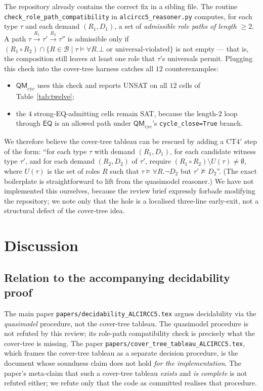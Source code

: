 \documentclass[]{ceurart}
\newcommand{\EQ}{\mathsf{EQ}}
\newcommand{\comp}{\circ}
\theoremstyle{definition}
\theoremstyle{remark}
\begin{document}
The repository already contains the correct fix in a sibling file.
The routine
\verb|check_role_path_compatibility| in \verb|alcircc5_reasoner.py|
computes, for each type $\tau$ and each demand $(R_1, D_1)$, a set of
\emph{admissible role paths of length $\geq 2$}. A path
$\tau \!\xrightarrow{R_1}\! \tau' \!\xrightarrow{R_2}\! \tau''$ is
admissible only if
$(R_1 \comp R_2) \cap \{R \in \mathcal{B} \mid \tau \models \forall
R . \bot \text{ or universal-violated} \}$ is not empty --- that
is, the composition still leaves at least one role that $\tau$'s
universals permit.  Plugging this check into the cover-tree harness
catches all $12$ counterexamples:
\begin{itemize}
  \item $\mathsf{QM}_{\mathrm{cyc}}$ uses this check and reports
    UNSAT on all $12$ cells of Table~\ref{tab:twelve};
  \item the $4$ strong-EQ-admitting cells remain SAT, because the
    length-$2$ loop through $\EQ$ is an allowed path under
    $\mathsf{QM}_{\mathrm{cyc}}$'s \verb|cycle_close=True| branch.
\end{itemize}

We therefore believe the cover-tree tableau can be rescued by adding
a CT4$'$ step of the form: ``for each type $\tau$ with demand
$(R_1, D_1)$, for each candidate witness type $\tau'$, and for each
demand $(R_2, D_2)$ of $\tau'$, require
$(R_1 \comp R_2) \setminus U(\tau) \neq \emptyset$, where $U(\tau)$ is
the set of roles $R$ such that $\tau \models \forall R . \neg D_2$ but
$\tau' \not\models D_2$''.  (The exact boilerplate is straightforward
to lift from the quasimodel reasoner.)  We have not implemented this
ourselves, because the review brief expressly forbade modifying the
repository; we note only that the hole is a localised three-line
early-exit, not a structural defect of the cover-tree idea.

\section{Discussion}
\label{sec:discussion}

\subsection{Relation to the accompanying decidability proof}

The main paper \verb|papers/decidability_ALCIRCC5.tex| argues
decidability via the \emph{quasimodel} procedure, not the cover-tree
tableau. The quasimodel procedure is not refuted by this review; its
role-path compatibility check is precisely what the cover-tree is
missing.  The paper
\verb|papers/cover_tree_tableau_ALCIRCC5.tex|, which frames the
cover-tree tableau as a separate decision procedure, is
the document whose soundness claim does not hold \emph{for the
implementation}. The paper's meta-claim that such a cover-tree
tableau \emph{exists} and \emph{is complete} is not refuted either; we
refute only that the code as committed realises that procedure.
\end{document}
